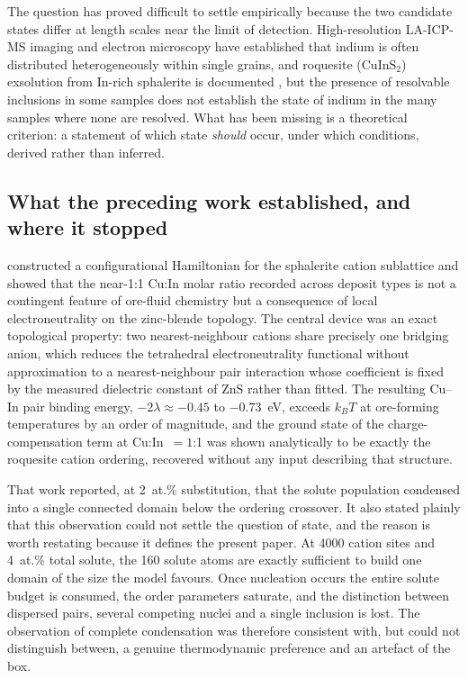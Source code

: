 \documentclass[11pt,a4paper]{article}
\begin{document}
The question has proved difficult to settle empirically because the two
candidate states differ at length scales near the limit of detection.
High-resolution LA-ICP-MS imaging and electron microscopy have established that
indium is often distributed heterogeneously within single grains, and roquesite
($\mathrm{CuInS_2}$) exsolution from In-rich sphalerite is documented
\citep{moura2007}, but the presence of resolvable inclusions in some samples
does not establish the state of indium in the many samples where none are
resolved. What has been missing is a theoretical criterion: a statement of which
state \emph{should} occur, under which conditions, derived rather than inferred.

\subsection{What the preceding work established, and where it stopped}

\citet{yu2026} constructed a configurational Hamiltonian for the sphalerite
cation sublattice and showed that the near-1:1 Cu:In molar ratio recorded across
deposit types is not a contingent feature of ore-fluid chemistry but a
consequence of local electroneutrality on the zinc-blende topology. The central
device was an exact topological property: two nearest-neighbour cations share
precisely one bridging anion, which reduces the tetrahedral electroneutrality
functional without approximation to a nearest-neighbour pair interaction whose
coefficient is fixed by the measured dielectric constant of ZnS rather than
fitted. The resulting Cu--In pair binding energy, $-2\lambda \approx -0.45$ to
$-0.73$~eV, exceeds $k_BT$ at ore-forming temperatures by an order of magnitude,
and the ground state of the charge-compensation term at Cu:In~$= 1$:1 was shown
analytically to be exactly the roquesite cation ordering, recovered without any
input describing that structure.

That work reported, at 2~at.\% substitution, that the solute population condensed
into a single connected domain below the ordering crossover. It also stated
plainly that this observation could not settle the question of state, and the
reason is worth restating because it defines the present paper. At 4000 cation
sites and 4~at.\% total solute, the 160 solute atoms are exactly sufficient to
build one domain of the size the model favours. Once nucleation occurs the
entire solute budget is consumed, the order parameters saturate, and the
distinction between dispersed pairs, several competing nuclei and a single
inclusion is lost. The observation of complete condensation was therefore
consistent with, but could not distinguish between, a genuine thermodynamic
preference and an artefact of the box.
\end{document}
